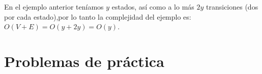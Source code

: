 En el ejemplo anterior teníamos \(y\) estados, así como a lo más \(2y\) transiciones (dos por cada estado),por lo tanto la complejidad del ejemplo es: \(O(V+E)=O(y+2y)=O(y)\).

\section*{Problemas de práctica}

\begin{exercise}
\end{exercise}

\begin{exercise}
\end{exercise}

\begin{exercise}
\end{exercise}

\begin{exercise}
\end{exercise}